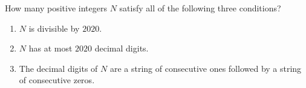 How many positive integers $N$ satisfy all of the following three conditions?
\begin{enumerate}[label = (\textit{\roman*})]
	\item $N$ is divisible by $2020$.
	\item $N$ has at most $2020$ decimal digits.
	\item The decimal digits of $N$ are a string of consecutive ones followed by a string of consecutive zeros.
\end{enumerate}
